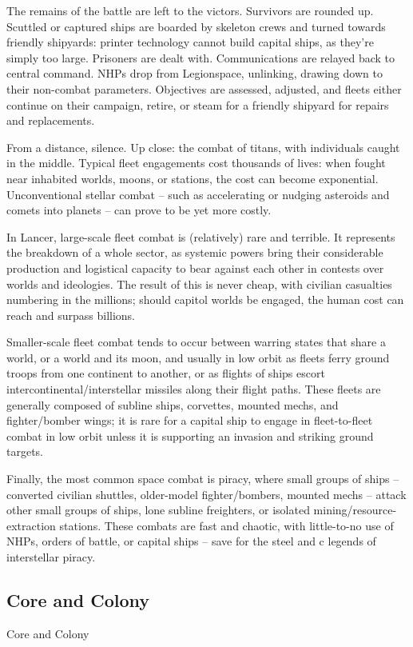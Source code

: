 The remains of the battle are left to the victors. Survivors are rounded up. Scuttled or captured  
ships are boarded by skeleton crews and turned towards friendly shipyards: printer technology  
cannot build capital ships, as they’re simply too large. Prisoners are dealt with. Communications  
are relayed back to central command. NHPs drop from Legionspace, unlinking, drawing down to  
their non-combat parameters. Objectives are assessed, adjusted, and fleets either continue on  
their campaign, retire, or steam for a friendly shipyard for repairs and replacements. 
 

From a distance, silence. Up close: the combat of titans, with individuals caught in the middle.  
Typical fleet engagements cost thousands of lives: when fought near inhabited worlds, moons, or  
stations, the cost can become exponential. Unconventional stellar combat -- such as  
accelerating or nudging asteroids and comets into planets -- can prove to be yet more costly.  
 

In Lancer, large-scale fleet combat is (relatively) rare and terrible. It represents the breakdown of  
a whole sector, as systemic powers bring their considerable production and logistical capacity to  
bear against each other in contests over worlds and ideologies. The result of this is never cheap,  
with civilian casualties numbering in the millions; should capitol worlds be engaged, the human  
cost can reach and surpass billions. 
 

Smaller-scale fleet combat tends to occur between warring states that share a world, or a world  
and its moon, and usually in low orbit as fleets ferry ground troops from one continent to another,  
or as flights of ships escort intercontinental/interstellar missiles along their flight paths. These  
fleets are generally composed of subline ships, corvettes, mounted mechs, and fighter/bomber  
wings; it is rare for a capital ship to engage in fleet-to-fleet combat in low orbit unless it is  
supporting an invasion and striking ground targets. 
 

Finally, the most common space combat is piracy, where small groups of ships -- converted  
civilian shuttles, older-model fighter/bombers, mounted mechs -- attack other small groups of  
ships, lone subline freighters, or isolated mining/resource-extraction stations. These combats are  
fast and chaotic, with little-to-no use of NHPs, orders of battle, or capital ships -- save for the  
steel and c legends of interstellar piracy.  
 
\subsection{Core and Colony}
Core and Colony  


